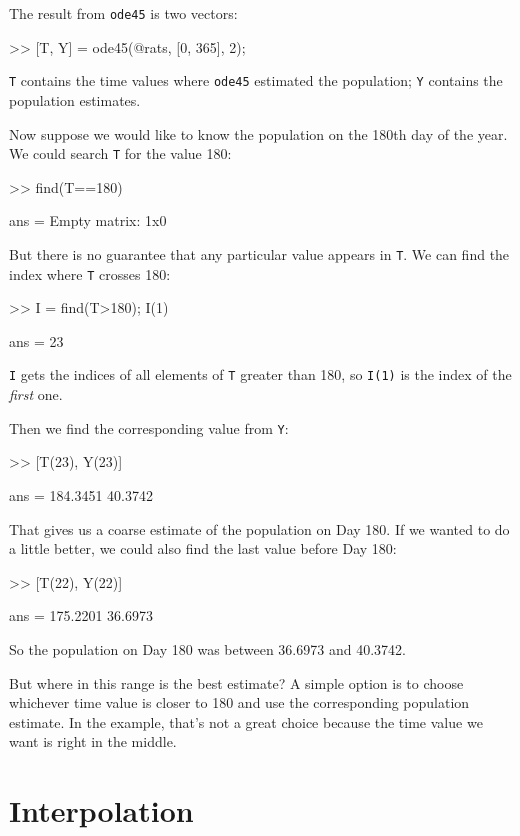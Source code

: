 \documentclass[
]{book}
\numberwithin{Answer}{chapter}
\numberwithin{Exercise}{chapter}
\begin{document}
The result from {\tt ode45} is two vectors:

\begin{code}
>> [T, Y] = ode45(@rats, [0, 365], 2);
\end{code}

{\tt T} contains the time values where {\tt ode45} estimated the
population; {\tt Y} contains the population estimates.

Now suppose we would like to know the population on the 180th day
of the year.  We could search {\tt T} for the value 180:

\begin{code}
>> find(T==180)

ans = Empty matrix: 1x0
\end{code}

But there is no guarantee that any particular value appears in
{\tt T}.  We can find the index where {\tt T} crosses 180:

\begin{code}
>> I = find(T>180); I(1)

ans = 23
\end{code}

{\tt I} gets the indices of all elements of {\tt T} greater
than 180, so {\tt I(1)} is the index of the {\em first} one.

Then we find the corresponding value from {\tt Y}:

\begin{code}
>> [T(23), Y(23)]

ans = 184.3451   40.3742
\end{code}

That gives us a coarse estimate of the population on Day 180.
If we wanted to do a little better, we could also find the last value
before Day 180:

\begin{code}
>> [T(22), Y(22)]

ans = 175.2201   36.6973
\end{code}

So the population on Day 180 was between 36.6973 and 40.3742.

But where in this range is the best estimate?  A simple option is to
choose whichever time value is closer to 180 and use the corresponding
population estimate.  In the example, that's not a great choice
because the time value we want is right in the middle.


\section{Interpolation}
\end{document}
